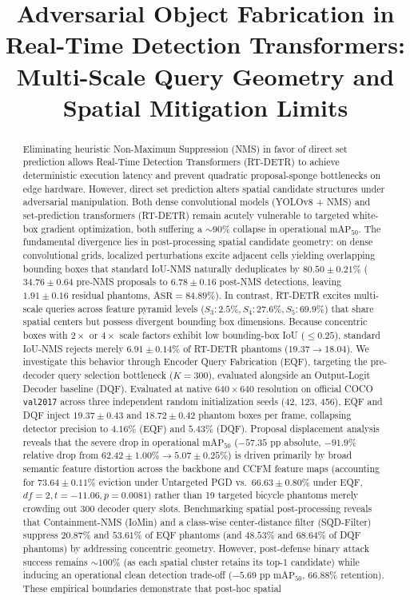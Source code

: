 \documentclass[preprint,12pt]{elsarticle}
\begin{document}
\begin{frontmatter}

\title{\textbf{Adversarial Object Fabrication in Real-Time Detection Transformers: Multi-Scale Query Geometry and Spatial Mitigation Limits}}

\begin{abstract}
Eliminating heuristic Non-Maximum Suppression (NMS) in favor of direct set prediction allows Real-Time Detection Transformers (RT-DETR) to achieve deterministic execution latency and prevent quadratic proposal-sponge bottlenecks on edge hardware. However, direct set prediction alters spatial candidate structures under adversarial manipulation. Both dense convolutional models (YOLOv8 + NMS) and set-prediction transformers (RT-DETR) remain acutely vulnerable to targeted white-box gradient optimization, both suffering a $\sim 90\%$ collapse in operational $\mathrm{mAP}_{50}$. The fundamental divergence lies in post-processing spatial candidate geometry: on dense convolutional grids, localized perturbations excite adjacent cells yielding overlapping bounding boxes that standard IoU-NMS naturally deduplicates by $80.50 \pm 0.21\%$ ($34.76 \pm 0.64$ pre-NMS proposals to $6.78 \pm 0.16$ post-NMS detections, leaving $1.91 \pm 0.16$ residual phantoms, $\mathrm{ASR} = 84.89\%$). In contrast, RT-DETR excites multi-scale queries across feature pyramid levels ($S_3: 2.5\%, S_4: 27.6\%, S_5: 69.9\%$) that share spatial centers but possess divergent bounding box dimensions. Because concentric boxes with $2\times$ or $4\times$ scale factors exhibit low bounding-box IoU ($\le 0.25$), standard IoU-NMS rejects merely $6.91 \pm 0.14\%$ of RT-DETR phantoms ($19.37 \to 18.04$). We investigate this behavior through Encoder Query Fabrication (EQF), targeting the pre-decoder query selection bottleneck ($K=300$), evaluated alongside an Output-Logit Decoder baseline (DQF). Evaluated at native $640\times 640$ resolution on official COCO \texttt{val2017} across three independent random initialization seeds (42, 123, 456), EQF and DQF inject $19.37 \pm 0.43$ and $18.72 \pm 0.42$ phantom boxes per frame, collapsing detector precision to $4.16\%$ (EQF) and $5.43\%$ (DQF). Proposal displacement analysis reveals that the severe drop in operational $\mathrm{mAP}_{50}$ ($-57.35\text{ pp}$ absolute, $-91.9\%$ relative drop from $62.42 \pm 1.00\% \to 5.07 \pm 0.25\%$) is driven primarily by broad semantic feature distortion across the backbone and CCFM feature maps (accounting for $73.64 \pm 0.11\%$ eviction under Untargeted PGD vs.\ $66.63 \pm 0.80\%$ under EQF, $df=2, t = -11.06, p = 0.0081$) rather than 19 targeted bicycle phantoms merely crowding out 300 decoder query slots. Benchmarking spatial post-processing reveals that Containment-NMS (IoMin) and a class-wise center-distance filter (SQD-Filter) suppress $20.87\%$ and $53.61\%$ of EQF phantoms (and $48.53\%$ and $68.64\%$ of DQF phantoms) by addressing concentric geometry. However, post-defense binary attack success remains $\sim 100\%$ (as each spatial cluster retains its top-1 candidate) while inducing an operational clean detection trade-off ($-5.69\text{ pp}$ $\mathrm{mAP}_{50}$, $66.88\%$ retention). These empirical boundaries demonstrate that post-hoc spatial 
\end{abstract}
\end{frontmatter}
\end{document}
